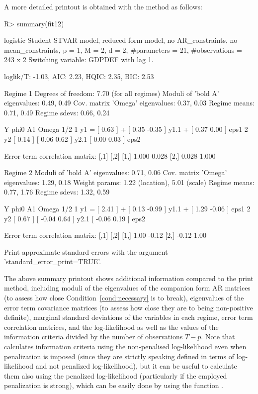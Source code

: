 \documentclass[nojss]{jss}
\begin{document}
A more detailed printout is obtained with the  method as follows:
%
\begin{CodeChunk}
\begin{CodeInput}
R> summary(fit12)
\end{CodeInput}
\begin{CodeOutput}
logistic Student STVAR model, reduced form model, no AR_constraints,
no mean_constraints,
  p = 1, M = 2, d = 2, #parameters = 21, #observations = 243 x 2
  Switching variable: GDPDEF with lag 1.

loglik/T: -1.03, AIC: 2.23, HQIC: 2.35, BIC: 2.53

Regime 1
Degrees of freedom: 7.70 (for all regimes)
Moduli of 'bold A' eigenvalues:  0.49, 0.49
Cov. matrix 'Omega' eigenvalues: 0.37, 0.03
Regime means: 0.71, 0.49
Regime sdevs: 0.66, 0.24

   Y     phi0          A1                  Omega        1/2
1 y1 = [ 0.63 ] + [  0.35 -0.35 ] y1.1 + [  0.37 0.00 ]     eps1
2 y2   [ 0.14 ]   [  0.06  0.62 ] y2.1   [  0.00 0.03 ]     eps2

Error term correlation matrix:
      [,1]  [,2]
[1,] 1.000 0.028
[2,] 0.028 1.000

Regime 2
Moduli of 'bold A' eigenvalues:  0.71, 0.06
Cov. matrix 'Omega' eigenvalues: 1.29, 0.18
Weight params: 1.22 (location), 5.01 (scale)
Regime means: 0.77, 1.76
Regime sdevs: 1.32, 0.59

   Y     phi0          A1                  Omega         1/2
1 y1 = [ 2.41 ] + [  0.13 -0.99 ] y1.1 + [  1.29 -0.06 ]     eps1
2 y2   [ 0.67 ]   [ -0.04  0.64 ] y2.1   [ -0.06  0.19 ]     eps2

Error term correlation matrix:
      [,1]  [,2]
[1,]  1.00 -0.12
[2,] -0.12  1.00

Print approximate standard errors with the argument 'standard_error_print=TRUE'.
\end{CodeOutput}
\end{CodeChunk}
%
The above summary printout shows additional information compared to the print method, including moduli of the eigenvalues of the companion form AR matrices (to assess how close Condition~\ref{cond:necessary} is to break), eigenvalues of the error term covariance matrices (to assess how close they are to being non-positive definite), marginal standard deviations of the variables in each regime, error term correlation matrices, and the log-likelihood as well as the values of the information criteria divided by the number of observations $T-p$. Note that  calculates information criteria using the non-penalised log-likelihood even when penalization is imposed (since they are strictly speaking defined in terms of log-likelihood and not penalized log-likelihood), but it can be useful to calculate them also using the penalized log-likelihood (particularly if the employed penalization is strong), which can be easily done by using the function .
\end{document}
